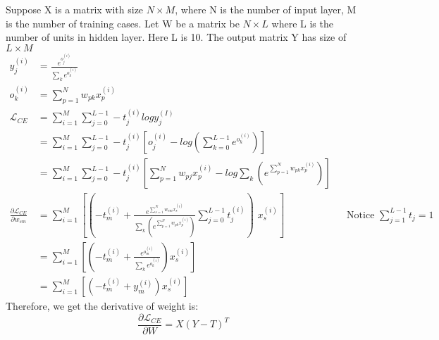 \documentclass[12pt]{article}
\begin{document}
Suppose X is a matrix with size $N\times M$, where N is the number of input layer, M is the number of training cases. Let W be a matrix be $N\times L$ where L is the number of units in hidden layer. Here L is 10. The output matrix Y has size of $L\times M$
\begin{align}
    y_j^{(i)} &= \frac{e^{o_j^{(i)}}}{\sum_k e^{o_k^{(i)}}}\\
    o_k^{(i)} &= \sum_{p=1}^{N}w_{pk}x_p^{(i)}\\
    \mathcal{L}_{CE} 
    &= \sum_{i=1}^M \sum_{j=0}^{L-1} -t_j^{(i)}logy_j^{(I)}\\
    &= \sum_{i=1}^M \sum_{j=0}^{L-1} -t_j^{(i)}[o_j^{(i)}-log(\sum_{k=0}^{L-1} e^{o_k^{(i)}})]\\
    &= \sum_{i=1}^M \sum_{j=0}^{L-1} -t_j^{(i)}[\sum_{p=1}^{N}w_{pj}x_p^{(i)} - log\sum_k (e^{\sum_{p=1}^{N}w_{pk}x_p^{(i)}})]\\
    \frac{\partial \mathcal{L}_{CE}}{\partial w_{sm}}
    &= \sum_{i=1}^M [(-t_m^{(i)} + \frac{e^{\sum_{s=1}^{N}w_{sm}x_s^{(i)}}}{\sum_k (e^{\sum_{p=1}^{N}w_{pk}x_p^{(i)}})}\sum_{j=0}^{L-1} t_j^{(i)})\,\,x_s^{(i)}] && \text{Notice $\sum_{j=1}^{L-1} t_j = 1$}\\
    &= \sum_{i=1}^M [(-t_m^{(i)} + \frac{e^{o_m^{(i)}}}{\sum_k e^{o_k^{(i)}}})x_s^{(i)}]\\
    &= \sum_{i=1}^M [(-t_m^{(i)} + y_m^{(i)})x_s^{(i)}]
\end{align}
Therefore, we get the derivative of weight is:
\[
    \frac{\partial \mathcal{L}_{CE}}{\partial W} = X(Y-T)^T
\]
\end{document}
